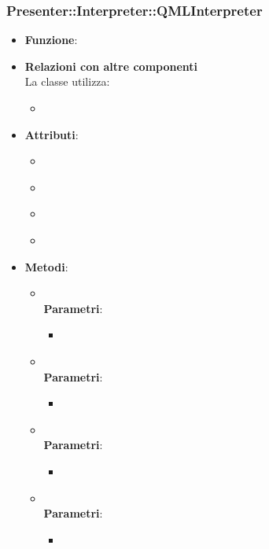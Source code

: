 \subsubsection{Presenter::Interpreter::QMLInterpreter}
\begin{itemize}
\item\textbf{Funzione}:
\item\textbf{Relazioni con altre componenti}\\
La classe utilizza:
	\begin{itemize}
		\item
	\end{itemize}
\item\textbf{Attributi}:
	\begin{itemize}
		\item\code{}\\
		\item\code{}\\
		\item\code{}\\
		\item\code{}\\
	\end{itemize}
\item\textbf{Metodi}:
	\begin{itemize}
		\item\code{}\\
		\textbf{Parametri}:
			\begin{itemize}
				\item\code{}\\
			\end{itemize}
		\item\code{}\\
		\textbf{Parametri}:
			\begin{itemize}
				\item\code{}\\
			\end{itemize}
		\item\code{}\\
		\textbf{Parametri}:
			\begin{itemize}
				\item\code{}\\
			\end{itemize}
		\item\code{}\\
		\textbf{Parametri}:
			\begin{itemize}
				\item\code{}\\
			\end{itemize}
	\end{itemize}
\end{itemize}

